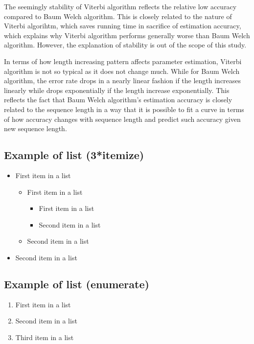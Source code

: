 \documentclass[paper=a4, fontsize=11pt]{scrartcl} %
\numberwithin{equation}{section} %
\numberwithin{figure}{section} %
\numberwithin{table}{section} %
\begin{document}
The seemingly stability of Viterbi algorithm reflects the relative low accuracy compared to Baum Welch algorithm. This is closely related to the nature of Viterbi algorihtm, which saves running time in sacrifice of estimation accuracy, which explains why Viterbi algorithm performs generally worse than Baum Welch algorithm. However, the explanation of stability is out of the scope of this study.

In terms of how length increasing pattern affects parameter estimation, Viterbi algorithm is not so typical as it does not change much. While for Baum Welch algorithm, the error rate drops in a nearly linear fashion if the length increases linearly while drops exponentially if the length increase exponentially. This reflects the fact that Baum Welch algorithm's estimation accuracy is closely related to the sequence length in a way that it is possible to fit a curve in terms of how accuracy changes with sequence length and predict such accuracy given new sequence length.


\subsection{Example of list (3*itemize)}
\begin{itemize}
	\item First item in a list 
		\begin{itemize}
		\item First item in a list 
			\begin{itemize}
			\item First item in a list 
			\item Second item in a list 
			\end{itemize}
		\item Second item in a list 
		\end{itemize}
	\item Second item in a list 
\end{itemize}


\subsection{Example of list (enumerate)}
\begin{enumerate}
\item First item in a list 
\item Second item in a list 
\item Third item in a list
\end{enumerate}

\end{document}
